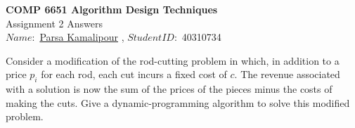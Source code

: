 \documentclass[10pt,letter,notitlepage]{article}
\newcommand{\red}[1]{{\color{red}#1}}
\newcounter{exercise}
\begin{document}
\begin{center}
  \large{\textbf{COMP 6651 Algorithm Design Techniques} \\ Assignment 2 Answers} \\


$Name:$ \href{https://benymaxparsa.github.io}{Parsa Kamalipour} \; , \; $Student ID:$ 40310734

\end{center}
%    
%
%


\begin{exercise}[(15 marks)]
Consider a modification of the rod-cutting problem in which, in addition to a price $p_i$ for each rod, each cut incurs a fixed cost of $c$. The revenue associated with a solution is now the sum of the prices of the pieces minus the costs of making the cuts. Give a dynamic-programming algorithm to solve this modified problem.

\end{exercise}

\end{document}
